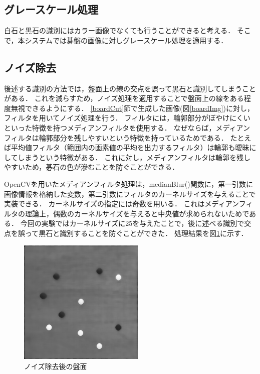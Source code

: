 \documentclass[openright]{nitocs}
\numberwithin{equation}{section}
\begin{document}
        \subsection{グレースケール処理} \label{grayscale}
            白石と黒石の識別にはカラー画像でなくても行うことができると考える．
            そこで，本システムでは碁盤の画像に対しグレースケール処理を適用する．
        

        \subsection{ノイズ除去} \label{noiseReduce}
            後述する識別の方法では，盤面上の線の交点を誤って黒石と識別してしまうことがある．
            これを減らすため，ノイズ処理を適用することで盤面上の線をある程度無視できるようにする． 
            \ref{boardCut}節で生成した画像(図\ref{boardImg})に対し，フィルタを用いてノイズ処理を行う．
            フィルタには，輪郭部分がぼやけにくいといった特徴を持つメディアンフィルタを使用する．
            なぜならば，メディアンフィルタは輪郭部分を残しやすいという特徴を持っているためである．
            たとえば平均値フィルタ（範囲内の画素値の平均を出力するフィルタ）は輪郭も曖昧にしてしまうという特徴がある．
            これに対し，メディアンフィルタは輪郭を残しやすいため，碁石の色が滲むことを防ぐことができる．
    
            OpenCVを用いたメディアンフィルタ処理は，medianBlur()関数に，第一引数に画像情報を格納した変数，第二引数にフィルタのカーネルサイズを与えることで実装できる．
            カーネルサイズの指定には奇数を用いる．
            これはメディアンフィルタの理論上，偶数のカーネルサイズを与えると中央値が求められないためである．
            今回の実験ではカーネルサイズに25を与えたことで，後に述べる識別で交点を誤って黒石と識別することを防ぐことができた．
            処理結果を図\ref{noiseReducedImg}に示す．
            \begin{figure}[tb] %
                \begin{center}
                \includegraphics[clip,width=60mm]{DSC_0041/noiseReducedImg.jpg} 
                \caption{ノイズ除去後の盤面}
                \label{noiseReducedImg}
                \end{center}
            \end{figure}
\end{document}
